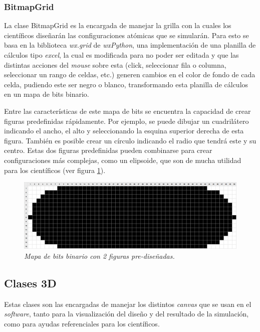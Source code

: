 \subsubsection{BitmapGrid}
La clase BitmapGrid es la encargada de manejar la grilla con la cuales los científicos diseñarán las configuraciones atómicas que se simularán. Para esto se basa en la biblioteca \emph{wx.grid} de \emph{wxPython}, una implementación de una planilla de cálculos tipo \emph{excel}, la cual es modificada para no poder ser editada y que las distintas acciones del \emph{mouse} sobre esta (click, seleccionar fila o columna, seleccionar un rango de celdas, etc.) generen cambios en el color de fondo de cada celda, pudiendo este ser negro o blanco, transformando esta planilla de cálculos en un mapa de bits binario.

Entre las características de este mapa de bits se encuentra la capacidad de crear figuras predefinidas rápidamente. Por ejemplo, se puede dibujar un cuadrilátero indicando el ancho, el alto y seleccionando la esquina superior derecha de esta figura. También es posible crear un círculo indicando el radio que tendrá este y su centro. Estas dos figuras predefinidas pueden combinarse para crear configuraciones más complejas, como un elipsoide, que son de mucha utilidad para los científicos (ver figura \ref{elipsoide}).

\begin{figure}[ht]
  \centering
  \includegraphics[scale=.25]{images/elipsoide}
  \caption{\em Mapa de bits binario con 2 figuras pre-diseñadas.}
  \label{elipsoide}
\end{figure}

\subsection{Clases 3D}

Estas clases son las encargadas de manejar los distintos \emph{canvas} que se usan en el \emph{software}, tanto para la visualización del diseño y del resultado de la simulación, como para ayudas referenciales para los científicos.

